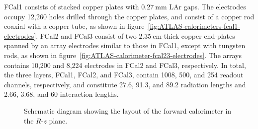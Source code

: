 FCal1 consists of stacked copper plates with $\SI{0.27}{\milli\meter}$ LAr gaps. The electrodes occupy 12,260 holes drilled through the copper plates, and consist of a copper rod coaxial with a copper tube, as shown in figure~\ref{fig:ATLAS-calorimeters-fcal1-electrodes}. FCal2 and FCal3 consist of two $\SI{2.35}{\centi\meter}$-thick copper end-plates spanned by an array electrodes similar to those in FCal1, except with tungsten rods, as shown in figure~\ref{fig:ATLAS-calorimeter-fcal23-electrodes}. The arrays contains 10,200 and 8,224 electrodes in FCal2 and FCal3, respectively. In total, the three layers, FCal1, FCal2, and FCal3, contain 1008, 500, and 254 readout channels, respectively, and constitute 27.6, 91.3, and 89.2 radiation lengths and 2.66, 3.68, and 60 interaction lengths. 

\begin{figure}
	\centering
	\caption{Schematic diagram showing the layout of the forward calorimeter in the $R$-$z$ plane.}
	\label{fig:ATLAS-calorimeters-fcal-layout}
\end{figure}


